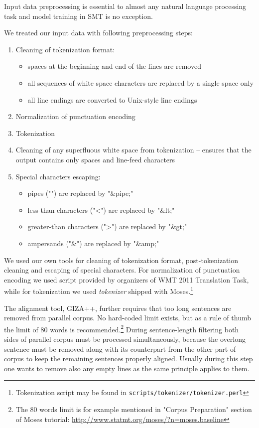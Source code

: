 Input data preprocessing is essential to almost any natural language processing task
and model training in SMT is no exception.

We treated our input data with following preprocessing steps:
\begin{enumerate}
  \item Cleaning of tokenization format:
  \begin{itemize}
    \item spaces at the beginning and end of the lines are removed
    \item all sequences of white space characters are replaced by a single space only
    \item all line endings are converted to Unix-style line endings
  \end{itemize}
  \item Normalization of punctuation encoding
  \item Tokenization
  \item Cleaning of any superfluous white space from tokenization -- ensures that the output contains only spaces and line-feed characters
  \item Special characters escaping:
  \begin{itemize}
    \item pipes ("\textbar") are replaced by "\&pipe;"
    \item less-than characters ("<") are replaced by "\&lt;"
    \item greater-than characters (">") are replaced by "\&gt;"
    \item ampersands ("\&") are replaced by "\&amp;"
  \end{itemize}
\end{enumerate}

We used our own tools for cleaning of tokenization format,
post-tokenization cleaning and escaping of special characters.
For normalization of punctuation encoding we used script provided by organizers of
WMT 2011 Translation Task,
while for tokenization we used \emph{tokenizer} shipped with
Moses.\footnote{Tokenization script may be found in \texttt{scripts/tokenizer/tokenizer.perl}}

The alignment tool, GIZA++, further requires that too long sentences are removed from parallel corpus.
No hard-coded limit exists, but as a rule of thumb the limit of 80 words is
recommended.\footnote{The 80 words limit is for example mentioned in "Corpus Preparation" section of Moses tutorial:
\url{http://www.statmt.org/moses/?n=moses.baseline}}
During sentence-length filtering both sides of parallel corpus must be processed simultaneously,
because the overlong sentence must be removed along with its counterpart from the other part of corpus
to keep the remaining sentences properly aligned.
Usually during this step one wants to remove also any empty lines as the same principle applies to them.

